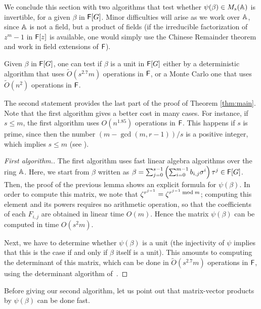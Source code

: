 We conclude this section with two algorithms that test whether
$\psi(\beta) \in M_s(\mathbb{A})$ is invertible, for a given $\beta$ in
${\mathsf{F}}[G]$. Minor difficulties will arise as we work over $\mathbb{A}$, since
$\mathbb{A}$ is not a field, but a product of fields (if the irreducible
factorization of $z^m-1$ in ${\mathsf{F}}[z]$ is available, one would simply use
the Chinese Remainder theorem and work in field extensions of ${\mathsf{F}}$).

\begin{corollary}\label{coro:test_meta}
  Given $\beta$ in ${\mathsf{F}}[G]$, one can test if $\beta$ is a unit in
  ${\mathsf{F}}[G]$ either by a deterministic algorithm that uses
  $\tilde{O}(s^{2.7} m)$ operations in ${\mathsf{F}}$, or a Monte Carlo one that
  uses $\tilde{O}(n^2)$ operations in ${\mathsf{F}}$.
\end{corollary}
The second statement provides the last part of the proof of Theorem
\ref{thm:main}. Note that the first algorithm gives a better cost in
many cases. For instance, if $s \leq m$, the first algorithm uses
$O(n^{1.85})$ operations in ${\mathsf{F}}$. This happens if $s$ is prime, since
then the number ${(m- \gcd(m,r-1))}/{s}$ is a positive integer,
which implies $s \leq m$ (see \cite[Theorem 47.12, Corollary 47.14
]{Curtis}).


\begin{proof}[First algorithm.]
  The first algorithm uses fast linear algebra algorithms over the ring
  $\mathbb{A}$. Here, we start from $\beta$ written as $\beta = \sum_{j =
    0}^{s-1} \left( \sum_{i = 0}^{m-1} b_{i,j} \sigma^i \right) \tau^j
  \in {\mathsf{F}}[G]$. Then, the proof of the previous lemma shows an explicit
  formula for $\psi(\beta)$. In order to compute this matrix, we note
  that $\zeta^{r^{j-1}} = \zeta^{r^{j-1} \bmod m}$; computing this
  element and its powers requires no arithmetic operation, so that the
  coefficients of each $F_{i,j}$ are obtained in linear time $O(m)$.
  Hence the matrix $\psi(\beta)$ can be computed in time $O(s^2m)$.

  Next, we have to determine whether $\psi(\beta)$ is a unit (the
  injectivity of $\psi$ implies that this is the case if and only if
  $\beta$ itself is a unit). This amounts to computing the determinant
  of this matrix, which can be done in $\tilde{O}(s^{2.7} m)$
  operations in ${\mathsf{F}}$, using the determinant algorithm
  of~\cite[Section~6]{KaVi04}.
\end{proof}

Before giving our second algorithm, let us point out that matrix-vector
products by $\psi(\beta)$ can be done fast.

